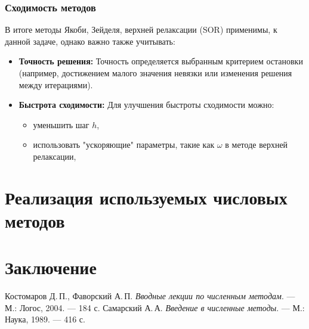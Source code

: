 \documentclass[a4paper, fleqn]{report}
\begin{document}
\subsection*{Сходимость методов}
В итоге методы Якоби, Зейделя, верхней релаксации (SOR) применимы, к данной задаче, однако важно также учитывать:
\begin{itemize}
    \item \textbf{Точность решения:} Точность определяется выбранным критерием остановки (например, достижением малого значения невязки или изменения решения между итерациями).
    \item \textbf{Быстрота сходимости:} Для улучшения быстроты сходимости можно:
    \begin{itemize}
        \item уменьшить шаг $h$,
        \item использовать "ускоряющие" параметры, такие как $\omega$ в методе верхней релаксации,
    \end{itemize}
\end{itemize}

\chapter*{Реализация используемых числовых методов}


\chapter*{Заключение}


\begin{thebibliography}{2}
\renewcommand{\bibname}{Литература}
Костомаров Д.\,П., Фаворский А.\,П. \textit{Вводные лекции по численным методам}. — М.: Логос, 2004. — 184 с.
Самарский А.\,А. \textit{Введение в численные методы}. — М.: Наука, 1989. — 416 с.
\end{thebibliography}
\end{document}
